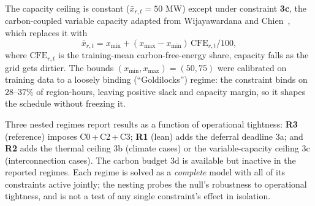 \documentclass[10pt,twocolumn]{article}
\begin{document}
The capacity ceiling is constant ($\bar x_{r,t}=50$ MW) except under constraint
\textbf{3c}, the carbon-coupled variable capacity adapted from Wijayawardana and
Chien~\citep{wijayawardana2025}, which replaces it with
\begin{equation}
\bar x_{r,t}=x_{\min}+(x_{\max}-x_{\min})\,\mathrm{CFE}_{r,t}/100,
\label{eq:varcap}
\end{equation}
where $\mathrm{CFE}_{r,t}$ is the training-mean carbon-free-energy share, capacity
falls as the grid gets dirtier. The bounds $(x_{\min},x_{\max})=(50,75)$ were
calibrated on training data to a loosely binding (``Goldilocks'') regime: the
constraint binds on $28$--$37\%$ of region-hours, leaving positive slack and capacity
margin, so it shapes the schedule without freezing it.

Three nested regimes report results as a function of operational tightness:
\textbf{R3} (reference) imposes C0\,+\,C2\,+\,C3; \textbf{R1} (lean) adds the deferral
deadline 3a; and \textbf{R2} adds the thermal ceiling 3b (climate cases) or the
variable-capacity ceiling 3c (interconnection cases). The carbon budget 3d is
available but inactive in the reported regimes. Each regime is solved as a
\emph{complete} model with all of its constraints active jointly; the nesting
probes the null's robustness to operational tightness, and is not a test of any
single constraint's effect in isolation.
\end{document}
